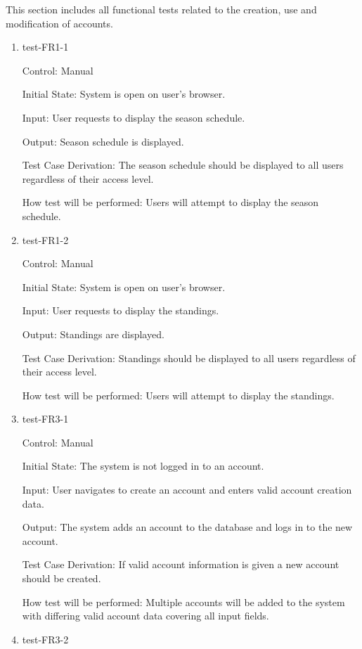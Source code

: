 \documentclass[12pt, titlepage]{article}
\begin{document}
This section includes all functional tests related to the creation, use and
modification of accounts.

\begin{enumerate}

  \item{test-FR1-1\\}

  Control: Manual

  Initial State: System is open on user's browser.

  Input: User requests to display the season schedule.

  Output: Season schedule is displayed.

  Test Case Derivation: The season schedule should be displayed to all users
  regardless of their access level.

  How test will be performed: Users will attempt to display
  the season schedule.

  \item{test-FR1-2\\}

  Control: Manual

  Initial State: System is open on user's browser.

  Input: User requests to display the standings.

  Output: Standings are displayed.

  Test Case Derivation: Standings should be displayed to all users
  regardless of their access level.

  How test will be performed: Users will attempt to display
  the standings.

  \item{test-FR3-1\\}

  Control: Manual

  Initial State: The system is not logged in to an account.

  Input: User navigates to create an account and enters valid account creation
  data.

  Output: The system adds an account to the database and logs in to the new
  account.

  Test Case Derivation: If valid account information is given a new account
  should be created.

  How test will be performed: Multiple accounts will be added to the system
  with differing valid account data covering all input fields.

  \item{test-FR3-2\\}


\end{enumerate}
\end{document}
